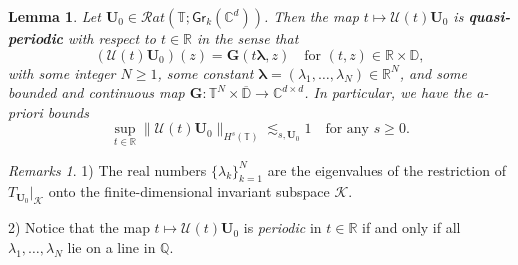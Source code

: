 \documentclass[10pt,reqno,a4paper]{amsart}
\newtheorem{lem}{Lemma}[section]
\theoremstyle{definition}
\theoremstyle{remark}
\theoremstyle{remark}
\newtheorem*{remarks*}{Remarks}
\numberwithin{equation}{section}
\newcommand{\C}{\mathbb{C}}
\newcommand{\R}{\mathbb{R}}
\newcommand{\T}{\mathbb{T}}
\newcommand{\D}{\mathbb{D}}
\newcommand{\ov}{\overline}
\newcommand{\Ub}{\mathbf{U}}
\newcommand{\Gb}{\mathbf{G}}
\newcommand{\Gr}{\mathsf{Gr}}
\newcommand{\Ks}{\mathscr{K}}
\newcommand{\Us}{\mathscr{U}}
\begin{document}
\begin{lem} \label{lem:quasi_periodic}
Let $\Ub_0 \in \mathcal{R}at(\T; \Gr_k(\C^d))$. Then the map $t \mapsto \Us(t) \Ub_0$ is \textbf{quasi-periodic} with respect to $t \in \R$ in the sense that
$$
(\Us(t) \Ub_0)(z) = \Gb(t \bm{\lambda}, z) \quad \mbox{for $(t, z) \in \R \times \D$},
$$ 
with some integer $N \geq 1$, some constant $\bm{\lambda}=(\lambda_1, \ldots, \lambda_N) \in \R^N$, and some bounded and continuous map $\Gb : \T^N \times \ov{\D} \to \C^{d \times d}$. In particular, we have the a-priori bounds
$$
\sup_{t \in \R} \| \Us(t) \Ub_0 \|_{H^s(\T)} \lesssim_{s,\Ub_0} 1 \quad \mbox{for any $s \geq 0$}.
$$
\end{lem}

\begin{remarks*}
1) The real numbers $\{ \lambda_k \}_{k =1}^N$ are the eigenvalues of the restriction of $T_{\Ub_0} |_\Ks$ onto the finite-dimensional invariant subspace $\Ks$.

2) Notice that the map $t \mapsto \Us(t) \Ub_0$ is {\em periodic} in $t \in \R$ if and only if all $\lambda_1, \ldots, \lambda_N$ lie on a line in $\mathbb{Q}$.
\end{remarks*}
\end{document}
